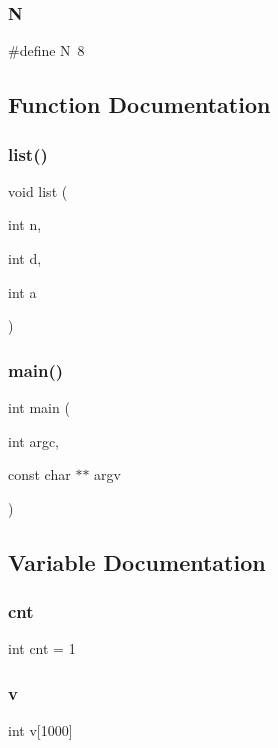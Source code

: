 \subsubsection{\texorpdfstring{N}{N}}
{\footnotesize\ttfamily \#define N~8}



\subsection{Function Documentation}
\mbox{\label{subsets_8_c_aed8fe9fe9c2153603c10f9e2ec007701}} 
\subsubsection{\texorpdfstring{list()}{list()}}
{\footnotesize\ttfamily void list (\begin{DoxyParamCaption}\item[{int}]{n,  }\item[{int}]{d,  }\item[{int}]{a }\end{DoxyParamCaption})}

\mbox{\label{subsets_8_c_a217dbf8b442f20279ea00b898af96f52}} 
\subsubsection{\texorpdfstring{main()}{main()}}
{\footnotesize\ttfamily int main (\begin{DoxyParamCaption}\item[{int}]{argc,  }\item[{const char $\ast$$\ast$}]{argv }\end{DoxyParamCaption})}



\subsection{Variable Documentation}
\mbox{\label{subsets_8_c_a9cfbb269728dc4185236d28be58d9eab}} 
\subsubsection{\texorpdfstring{cnt}{cnt}}
{\footnotesize\ttfamily int cnt = 1}

\mbox{\label{subsets_8_c_a507f6ffe173a9be4a3f93aefae2f4b46}} 
\subsubsection{\texorpdfstring{v}{v}}
{\footnotesize\ttfamily int v\mbox{[}1000\mbox{]}}

